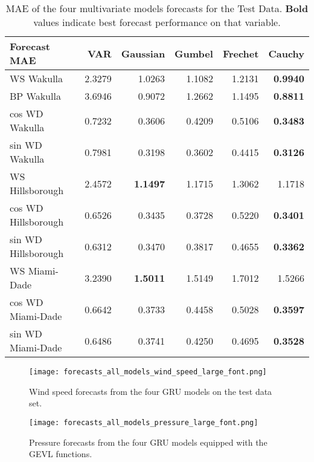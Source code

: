\documentclass[conference]{IEEEtran}
\begin{document}
\begin{table}[t]
    \centering
    \begin{tabular}{lrrrrr}
\hline
                        Forecast MAE & VAR & Gaussian &  Gumbel &  Frechet &  Cauchy \\
\hline
         WS Wakulla &  2.3279 & 1.0263 & 1.1082 & 1.2131 & \textbf{0.9940} \\
 BP Wakulla &  3.6946 & 0.9072 & 1.2662 & 1.1495 & \textbf{0.8811} \\
       cos WD Wakulla & 0.7232 & 0.3606 & 0.4209 & 0.5106 & \textbf{0.3483} \\
       sin WD Wakulla & 0.7981 & 0.3198 & 0.3602 & 0.4415 & \textbf{0.3126} \\
    WS Hillsborough & 2.4572 & \textbf{1.1497} & 1.1715 & 1.3062 & 1.1718 \\
  cos WD Hillsborough & 0.6526 & 0.3435 & 0.3728 & 0.5220 & \textbf{0.3401} \\
  sin WD Hillsborough & 0.6312 & 0.3470 & 0.3817 & 0.4655 & \textbf{0.3362} \\
           WS Miami-Dade & 3.2390 & \textbf{1.5011} & 1.5149 & 1.7012 & 1.5266 \\
         cos WD Miami-Dade & 0.6642 & 0.3733 & 0.4458 & 0.5028 & \textbf{0.3597} \\
         sin WD Miami-Dade & 0.6486 & 0.3741 & 0.4250 & 0.4695 & \textbf{0.3528} \\
\hline
\end{tabular}
    \caption{MAE of the four multivariate models forecasts for the Test Data. \textbf{Bold} values indicate best forecast performance on that variable.}
    \label{tab:forecast-gru-mae}
\end{table}

\begin{figure}[b]
    \centering
    \texttt{[image: forecasts\_all\_models\_wind\_speed\_large\_font.png]}
    \caption{Wind speed forecasts from the four GRU models on the test data set.}
    \label{fig:wind-speed-gru}
\end{figure}



\begin{figure}[t]
    \centering
    \texttt{[image: forecasts\_all\_models\_pressure\_large\_font.png]}
    \caption{Pressure forecasts from the four GRU models equipped with the GEVL functions.}
    \label{fig:pressure-forecasts}
\end{figure}    
\end{document}
